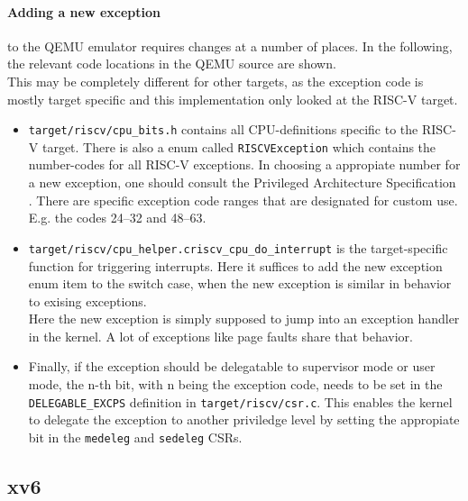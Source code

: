 \paragraph{Adding a new exception}to the QEMU emulator requires changes at a number of places. In the following,
the relevant code locations in the QEMU source are shown.\\
This may be completely different for other targets, as the exception code is mostly target specific and
this implementation only looked at the RISC-V target.
\begin{itemize}
    \item \texttt{target/riscv/cpu\_bits.h} contains all CPU-definitions specific to the RISC-V target.
          There is also a enum called \texttt{RISCVException} which contains the number-codes for all RISC-V exceptions.
          In choosing a appropiate number for a new exception, one should consult the Privileged Architecture Specification \cite{RISCVInstructionSet}.
          There are specific exception code ranges that are designated for custom use. E.g. the codes 24--32 and 48--63.
    \item \texttt{target/riscv/cpu\_helper.c\:riscv\_cpu\_do\_interrupt\(\)} is the target-specific function
          for triggering interrupts. Here it suffices to add the new exception enum item to the switch case, when
          the new exception is similar in behavior to exising exceptions.\\
          Here the new exception is simply supposed to jump into an exception handler in the kernel. A lot of exceptions
          like page faults share that behavior.
    \item Finally, if the exception should be delegatable to supervisor mode or user mode, the n-th bit,
          with n being the exception code, needs to be set in the \texttt{DELEGABLE\_EXCPS} definition in \texttt{target/riscv/csr.c}.
          This enables the kernel to delegate the exception to another priviledge level by setting the appropiate
          bit in the \texttt{medeleg} and \texttt{sedeleg} CSRs.
\end{itemize}



\subsection{xv6}


